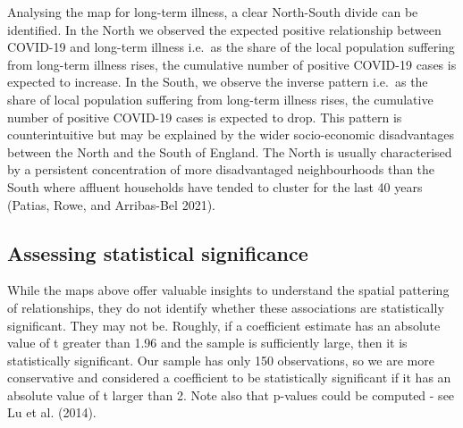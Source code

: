 \documentclass[
  letterpaper,
  DIV=11,
  numbers=noendperiod,
  oneside]{scrreprt}
\begin{document}
Analysing the map for long-term illness, a clear North-South divide can
be identified. In the North we observed the expected positive
relationship between COVID-19 and long-term illness i.e.~as the share of
the local population suffering from long-term illness rises, the
cumulative number of positive COVID-19 cases is expected to increase. In
the South, we observe the inverse pattern i.e.~as the share of local
population suffering from long-term illness rises, the cumulative number
of positive COVID-19 cases is expected to drop. This pattern is
counterintuitive but may be explained by the wider socio-economic
disadvantages between the North and the South of England. The North is
usually characterised by a persistent concentration of more
disadvantaged neighbourhoods than the South where affluent households
have tended to cluster for the last 40 years (Patias, Rowe, and
Arribas-Bel 2021).

\subsection{Assessing statistical
significance}\label{assessing-statistical-significance}

While the maps above offer valuable insights to understand the spatial
pattering of relationships, they do not identify whether these
associations are statistically significant. They may not be. Roughly, if
a coefficient estimate has an absolute value of t greater than 1.96 and
the sample is sufficiently large, then it is statistically significant.
Our sample has only 150 observations, so we are more conservative and
considered a coefficient to be statistically significant if it has an
absolute value of t larger than 2. Note also that p-values could be
computed - see Lu et al. (2014).
\end{document}
